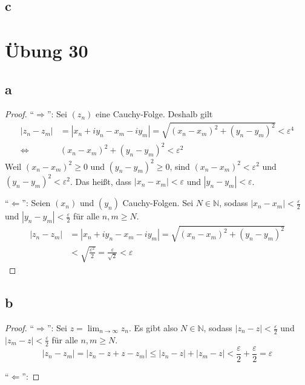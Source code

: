 \documentclass[a4paper,10pt]{article}
\begin{document}
\subsection*{c}

\section*{Übung 30}

\subsection*{a}

\begin{proof}
 ``$\Rightarrow$'': Sei $(z_n)$ eine Cauchy-Folge.
 Deshalb gilt
 \begin{align*}
  |z_n - z_m| & = |x_n + iy_n - x_m - iy_m| = \sqrt{(x_n - x_m)^2 + (y_n - y_m)^2} < \varepsilon^4\\
  \Leftrightarrow & (x_n - x_m)^2 + (y_n - y_m)^2 < \varepsilon^2
 \end{align*}
 Weil $(x_n - x_m)^2 \ge 0$ und $(y_n - y_m)^2 \ge 0$, sind $(x_n - x_m)^2 < \varepsilon^2$ und $(y_n - y_m)^2 < \varepsilon^2$.
 Das heißt, dass $|x_n - x_m| < \varepsilon$ und $|y_n - y_m| < \varepsilon$.
 
 ``$\Leftarrow$'': Seien $(x_n)$ und $(y_n)$ Cauchy-Folgen.
 Sei $N \in \mathbb{N}$, sodass $|x_n - x_m| < \frac{\varepsilon}{2}$ und $|y_n - y_m| < \frac{\varepsilon}{2}$ für alle $n, m \ge N$.
 \begin{align*}
  |z_n - z_m| & = |x_n + iy_n - x_m - iy_m| = \sqrt{(x_n - x_m)^2 + (y_n - y_m)^2}\\
  & < \sqrt{\frac{\varepsilon^2}{2}} = \frac{\varepsilon}{\sqrt{2}} < \varepsilon
 \end{align*}
\end{proof}

\subsection*{b}

\begin{proof}
 ``$\Rightarrow$'': Sei $z = \lim_{n \rightarrow \infty} z_n$.
 Es gibt also $N \in \mathbb{N}$, sodass $|z_n - z| < \frac{\varepsilon}{2}$ und $|z_m - z| < \frac{\varepsilon}{2}$ für alle $n, m \ge N$.
 \begin{equation}
  |z_n - z_m| = |z_n - z + z - z_m| \le |z_n - z| + |z_m - z| < \frac{\varepsilon}{2} + \frac{\varepsilon}{2} = \varepsilon
 \end{equation}

 
 ``$\Leftarrow$'':
\end{proof}
\end{document}
